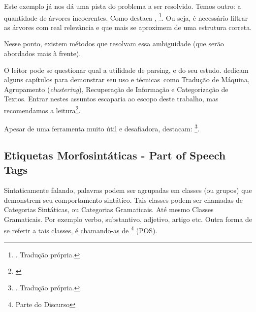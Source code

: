 Este exemplo já nos dá uma pista do problema a ser resolvido. Temos outro: a quantidade de árvores incoerentes. Como destaca , 
\footnote{. Tradução própria.}.
Ou seja, é necessário filtrar as árvores com real relevância e que mais se aproximem de uma estrutura correta.

Nesse ponto, existem métodos que resolvam essa ambiguidade (que serão abordados mais à frente).

O leitor pode se questionar qual a utilidade de parsing, e do seu estudo.  dedicam alguns capítulos para demonstrar seu uso e técnicas\ como Tradução de Máquina, Agrupamento (\textit{clustering}), Recuperação de Informação e Categorização de Textos. Entrar nestes assuntos escaparia ao escopo deste trabalho, mas recomendamos a leitura\footnote{\cite[capítulos~13,14,15,16]{Manning1999FoundationsNLP}}.

Apesar de uma ferramenta muito útil e desafiadora,  destacam:
\footnote{. Tradução própria.}. 


\subsection{Etiquetas Morfosintáticas - Part of Speech Tags}
\label{subsec:POStags}

Sintaticamente falando, palavras podem ser agrupadas em classes (ou grupos) que demonstrem seu comportamento sintático. Tais classes podem ser chamadas de Categorias Sintáticas, ou Categorias Gramaticais. Até mesmo Classes Gramaticais. Por exemplo verbo, substantivo, adjetivo, artigo etc. Outra forma de se referir a tais classes, é chamando-as de \footnote{Parte do Discurso} (POS).

